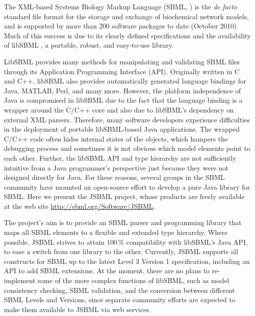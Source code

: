 \documentclass{bioinfo}
\begin{document}
The XML-based Systems Biology Markup Language (SBML, \citealt{Hucka2003}) is
the \emph{de facto} standard file format for the storage and exchange of
biochemical network models, and is supported by more than 200
software packages to date (October 2010). Much of this success is due to its
clearly defined specifications and the availability of libSBML \citep{Bornstein2008}, a
portable, robust, and easy-to-use library.

LibSBML provides many methods for manipulating and validating
SBML files through its Application Programming Interface (API).
Originally written in C and C++, libSBML also provides automatically generated 
language bindings for Java\texttrademark, MATLAB\texttrademark, Perl, and
many more. However, the platform independence of Java is compromised
in libSBML due to the fact that the language binding is a
wrapper around the C/C++ core and also due to libSBML's dependency on
external XML parsers. 
Therefore, many software developers experience difficulties in
the deployment of portable libSBML-based Java applications.
The wrapped C/C++ code often
hides internal states of the objects, which hampers the debugging process
and sometimes it is not obvious which model elements point to each other.
Further, the libSBML API and type hierarchy are not sufficiently intuitive from a
Java programmer's perspective just because they were not
designed directly for Java. For these reasons, several groups in
the SBML community have mounted an open-source effort to
develop a pure Java library for SBML. Here we present the JSBML
project, whose products are freely available at the web site
\href{http://sbml.org/Software/JSBML}{http://sbml.org/Software/JSBML}.

The project's aim is to provide an SBML parser and programming
library that maps all SBML elements to a flexible and extended
type hierarchy. Where possible, JSBML strives to attain
100\,\% compatibility with libSBML's Java API, to ease a switch from
one library to the other. Currently, JSBML supports all constructs
for SBML up to the latest Level 3 Version 1 specification,
including an API to add SBML extensions. At the moment, there are no
plans to re-implement some of the more complex functions of
libSBML, such as model consistency checking, SBML validation,
and the conversion between different SBML Levels and Versions,
since separate community efforts are expected to make them
available to JSBML via web services.
\end{document}
